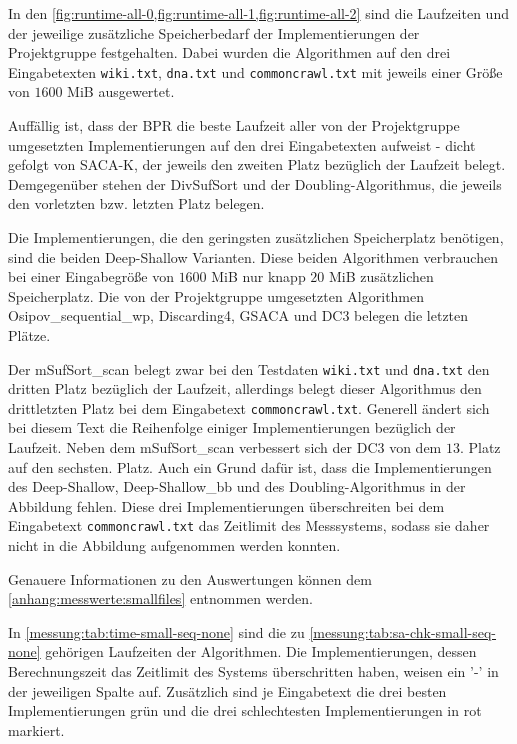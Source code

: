 %
%

In den \cref{fig:runtime-all-0,fig:runtime-all-1,fig:runtime-all-2} sind die Laufzeiten und der jeweilige zusätzliche Speicherbedarf der Implementierungen der Projektgruppe festgehalten. Dabei wurden die Algorithmen auf den drei Eingabetexten \texttt{wiki.txt}, \texttt{dna.txt} und \texttt{commoncrawl.txt} mit jeweils einer Größe von $1600$ MiB ausgewertet.

Auffällig ist, dass der BPR die beste Laufzeit aller von der Projektgruppe umgesetzten Implementierungen auf den drei Eingabetexten aufweist - dicht gefolgt von SACA-K, der jeweils den zweiten Platz bezüglich der Laufzeit belegt. Demgegenüber stehen der DivSufSort und der Doubling-Algorithmus, die jeweils den vorletzten bzw. letzten Platz belegen.

Die Implementierungen, die den geringsten zusätzlichen Speicherplatz benötigen, sind die beiden Deep-Shallow Varianten. Diese beiden Algorithmen verbrauchen bei einer Eingabegröße von $1600$ MiB nur knapp $20$ MiB zusätzlichen Speicherplatz. Die von der Projektgruppe umgesetzten Algorithmen Osipov\_sequential\_wp, Discarding4, GSACA und DC3 belegen die letzten Plätze.

Der mSufSort\_scan belegt zwar bei den Testdaten \texttt{wiki.txt} und \texttt{dna.txt} den dritten Platz bezüglich der Laufzeit, allerdings belegt dieser Algorithmus den drittletzten Platz bei dem Eingabetext \texttt{commoncrawl.txt}. Generell ändert sich bei diesem Text die Reihenfolge einiger Implementierungen bezüglich der Laufzeit. Neben dem mSufSort\_scan verbessert sich der DC3 von dem $13$. Platz auf den sechsten. Platz. Auch ein Grund dafür ist, dass die Implementierungen des Deep-Shallow, Deep-Shallow\_bb und des Doubling-Algorithmus in der Abbildung fehlen. Diese drei Implementierungen überschreiten bei dem Eingabetext \texttt{commoncrawl.txt} das Zeitlimit des Messsystems, sodass sie daher nicht in die Abbildung aufgenommen werden konnten.

Genauere Informationen zu den Auswertungen können dem \cref{anhang:messwerte:smallfiles} entnommen werden.

In \cref{messung:tab:time-small-seq-none} sind die zu \cref{messung:tab:sa-chk-small-seq-none} gehörigen Laufzeiten der Algorithmen. Die Implementierungen, dessen Berechnungszeit das Zeitlimit des Systems überschritten haben, weisen ein '-' in der jeweiligen Spalte auf. Zusätzlich sind je Eingabetext die drei besten Implementierungen grün und die drei schlechtesten Implementierungen in rot markiert.

